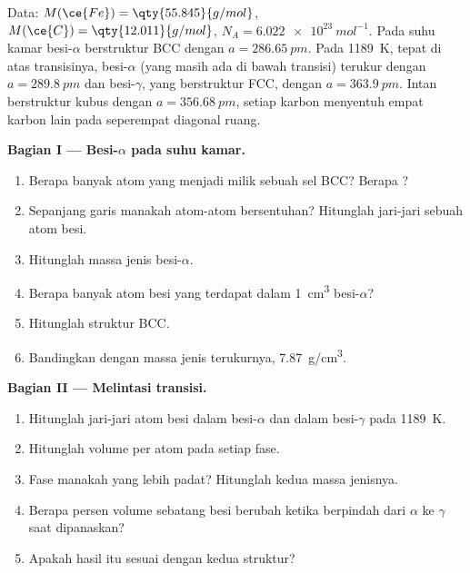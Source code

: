 \begin{problem}
\label{pb:b1:crystals-metals:1}
Data: $M(\ce{Fe}) = \qty{55.845}{g/mol}$, $M(\ce{C}) = \qty{12.011}{g/mol}$,
$N_A = \qty{6.022e23}{mol^{-1}}$. Pada suhu kamar besi-$\alpha$
berstruktur BCC dengan $a = \qty{286.65}{pm}$. Pada \qty{1189}{K}, tepat
di atas transisinya, besi-$\alpha$ (yang masih ada di bawah transisi)
terukur dengan $a = \qty{289.8}{pm}$ dan besi-$\gamma$, yang berstruktur
FCC, dengan $a = \qty{363.9}{pm}$. Intan berstruktur kubus dengan
$a = \qty{356.68}{pm}$, setiap karbon menyentuh empat karbon lain pada
seperempat diagonal ruang.

\medskip
\noindent\textbf{Bagian I --- Besi-$\alpha$ pada suhu kamar.}
\begin{enumerate}
  \item Berapa banyak atom yang menjadi milik sebuah sel BCC? Berapa
        ?
  \item Sepanjang garis manakah atom-atom bersentuhan? Hitunglah
        jari-jari sebuah atom besi.
  \item Hitunglah massa jenis besi-$\alpha$.
  \item Berapa banyak atom besi yang terdapat dalam \qty{1}{cm^3}
        besi-$\alpha$?
  \item Hitunglah  struktur BCC.
  \item Bandingkan dengan massa jenis terukurnya, \qty{7.87}{g/cm^3}.
\end{enumerate}

\medskip
\noindent\textbf{Bagian II --- Melintasi transisi.}
\begin{enumerate}[resume]
  \item Hitunglah jari-jari atom besi dalam besi-$\alpha$ dan dalam
        besi-$\gamma$ pada \qty{1189}{K}.
  \item Hitunglah volume per atom pada setiap fase.
  \item Fase manakah yang lebih padat? Hitunglah kedua massa jenisnya.
  \item Berapa persen volume sebatang besi berubah ketika berpindah dari
        $\alpha$ ke $\gamma$ saat dipanaskan?
  \item Apakah hasil itu sesuai dengan  kedua struktur?
\end{enumerate}


\end{problem}
